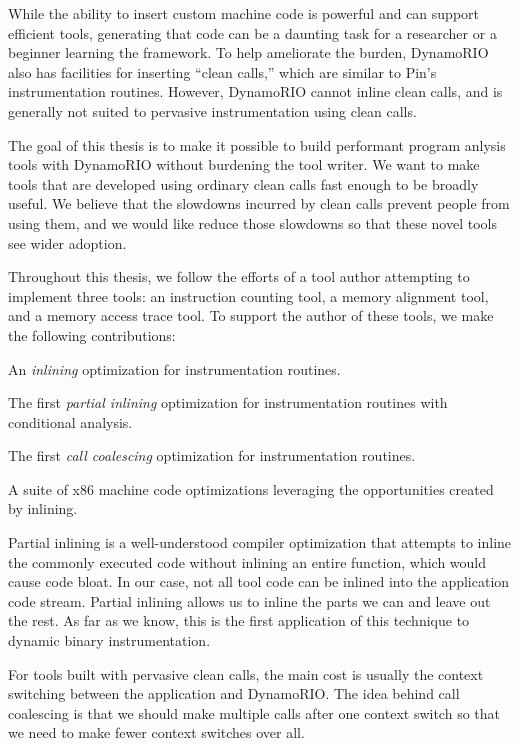 While the ability to insert custom machine code is powerful and can support
efficient tools, generating that code can be a daunting task for a researcher or
a beginner learning the framework.  To help ameliorate the burden, DynamoRIO
also has facilities for inserting ``clean calls,'' which are similar to Pin's
instrumentation routines.  However, DynamoRIO cannot inline clean calls, and is
generally not suited to pervasive instrumentation using clean calls.

The goal of this thesis is to make it possible to build performant program
anlysis tools with DynamoRIO without burdening the tool writer.  We want to make
tools that are developed using ordinary clean calls fast enough to be broadly
useful.  We believe that the slowdowns incurred by clean calls prevent people
from using them, and we would like reduce those slowdowns so that these novel
tools see wider adoption.


Throughout this thesis, we follow the efforts of a tool author attempting to
implement three tools: an instruction counting tool, a memory alignment tool,
and a memory access trace tool.  To support the author of these tools, we make
the following contributions:

\begin{packed_itemize}
\item An {\em inlining} optimization for instrumentation routines.
\item The first {\em partial inlining} optimization for instrumentation
routines with conditional analysis.
\item The first {\em call coalescing} optimization for instrumentation
routines.
\item A suite of x86 machine code optimizations leveraging the opportunities
created by inlining.
\end{packed_itemize}

Partial inlining is a well-understood compiler optimization that attempts to
inline the commonly executed code without inlining an entire function, which
would cause code bloat.  In our case, not all tool code can be inlined into the
application code stream.  Partial inlining allows us to inline the parts we can
and leave out the rest.  As far as we know, this is the first application of
this technique to dynamic binary instrumentation.

For tools built with pervasive clean calls, the main cost is
usually the context switching between the application and DynamoRIO.  The idea
behind call coalescing is that we should make multiple calls after one context
switch so that we need to make fewer context switches over all.

